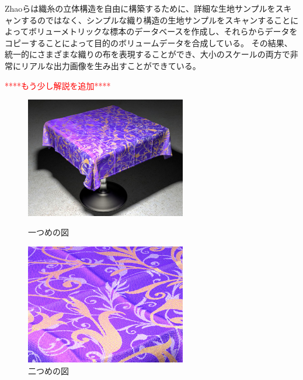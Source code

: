 Zhaoら\cite{}は織糸の立体構造を自由に構築するために、詳細な生地サンプルをスキャンするのではなく、シンプルな織り構造の生地サンプルをスキャンすることによってボリューメトリックな標本のデータベースを作成し、それらからデータをコピーすることによって目的のボリュームデータを合成している。
その結果、統一的にさまざまな織りの布を表現することができ、大小のスケールの両方で非常にリアルな出力画像を生み出すことができている。

\textcolor{red}{****もう少し解説を追加****}

\begin{figure}[htbp]
 \begin{minipage}{0.4\hsize}
  \begin{center}
   \includegraphics[width=70mm]{./img/mft_purple_cloth_ld.jpg}
  \end{center}
  \caption{一つめの図}
  \label{fig:one}
 \end{minipage}
 \begin{minipage}{0.75\hsize}
  \begin{center}
    \includegraphics[width=70mm]{./img/mft_zoom_ld.jpg}
  \end{center}
  \caption{二つめの図}
  \label{fig:two}
 \end{minipage}
\end{figure}


